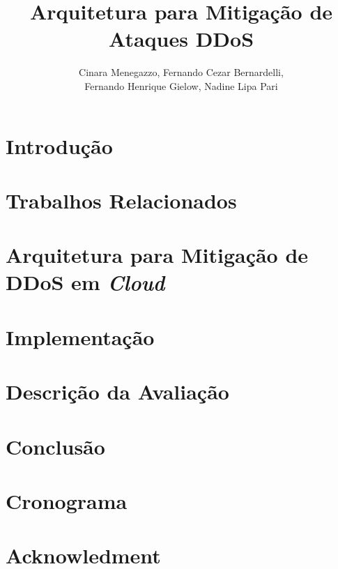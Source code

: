 \documentclass[a4paper, 12pt]{article}
\begin{document}
\title{Arquitetura para Mitigação de Ataques DDoS}

\author{
Cinara Menegazzo,
Fernando Cezar Bernardelli, \\
Fernando Henrique Gielow,
Nadine Lipa Pari
}
   

   
\address{Departamento de Informática -- Universidade Federal do Paraná\\
NR2 - Núcleo de Redes Sem Fio e Redes Avançadas\\
  Caixa Postal 19.081 -- 81.531-980 -- Curitiba -- PR -- Brasil
}     

\maketitle


\begin{resumo}

\end{resumo}



\section{Introdução}



\section{Trabalhos Relacionados}

 



\section{Arquitetura para Mitigação de DDoS em \emph{Cloud}}


\section{Implementação}



\section{Descrição da Avaliação}


\section{Conclusão}



\section{Cronograma}


\section{Acknowledment}



% 



\end{document}
